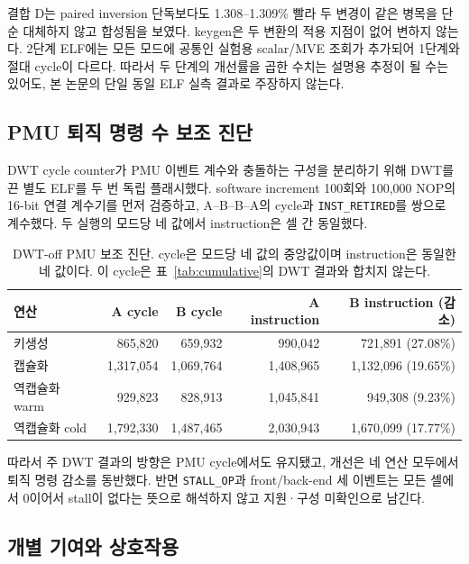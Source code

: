 \documentclass[runningheads,orivec]{llncs}
\begin{document}
결합 D는 paired inversion 단독보다도 1.308--1.309\% 빨라 두 변경이 같은 병목을
단순 대체하지 않고 합성됨을 보였다. keygen은 두 변환의 적용 지점이 없어 변하지 않는다.
2단계 ELF에는 모든 모드에 공통인 실험용 scalar/MVE 조회가 추가되어 1단계와 절대
cycle이 다르다. 따라서 두 단계의 개선률을 곱한 수치는 설명용 추정이 될 수는 있어도,
본 논문의 단일 동일 ELF 실측 결과로 주장하지 않는다.

\subsection{PMU 퇴직 명령 수 보조 진단}\label{sec:pmu}

DWT cycle counter가 PMU 이벤트 계수와 충돌하는 구성을 분리하기 위해 DWT를 끈 별도
ELF를 두 번 독립 플래시했다. software increment 100회와 100,000 NOP의 16-bit
연결 계수기를 먼저 검증하고, A--B--B--A의 cycle과 \texttt{INST\_RETIRED}를 쌍으로
계수했다. 두 실행의 모드당 네 값에서 instruction은 셀 간 동일했다.

\begin{table}[H]\centering\small
\caption{DWT-off PMU 보조 진단. cycle은 모드당 네 값의 중앙값이며 instruction은
동일한 네 값이다. 이 cycle은 표~\ref{tab:cumulative}의 DWT 결과와 합치지 않는다.}
\label{tab:pmu}
\begin{tabular}{lrrrr}\toprule
연산 & A cycle & B cycle & A instruction & B instruction (감소)\\\midrule
키생성 & 865,820 & 659,932 & 990,042 & 721,891 (27.08\%)\\
캡슐화 & 1,317,054 & 1,069,764 & 1,408,965 & 1,132,096 (19.65\%)\\
역캡슐화 warm & 929,823 & 828,913 & 1,045,841 & 949,308 (9.23\%)\\
역캡슐화 cold & 1,792,330 & 1,487,465 & 2,030,943 & 1,670,099 (17.77\%)\\\bottomrule
\end{tabular}
\end{table}
\FloatBarrier

따라서 주 DWT 결과의 방향은 PMU cycle에서도 유지됐고, 개선은 네 연산 모두에서 퇴직
명령 감소를 동반했다. 반면 \texttt{STALL\_OP}과 front/back-end 세 이벤트는 모든
셀에서 0이어서 stall이 없다는 뜻으로 해석하지 않고 지원·구성 미확인으로 남긴다.

\subsection{개별 기여와 상호작용}\label{sec:attribution}
\end{document}
